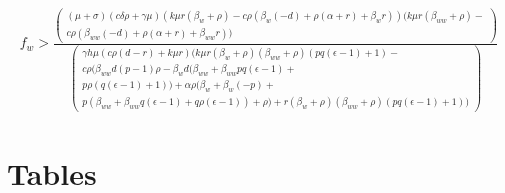 \documentclass[11pt]{article}
\begin{document}
\begin{align}
	f_w > \frac{\begin{pmatrix}
			(\mu +\sigma ) (c \delta  \rho +\gamma  \mu ) (k \mu  r (\beta_w+\rho )-c \rho  (\beta_w (-d)+\rho  (\alpha +r)+\beta_w r)) (k \mu  r (\beta_{ww}+\rho )- \\
			c \rho  (\beta_{ww} (-d)+\rho  (\alpha +r)+\beta_{ww} r))
		\end{pmatrix}}{\begin{pmatrix}
		\gamma  h \mu  (c \rho  (d-r)+k \mu  r) (k \mu  r (\beta_w+\rho ) (\beta_{ww}+\rho ) (p q (\epsilon -1)+1) - \\ 
		c \rho  (\beta_{ww} d (p-1) \rho -\beta_w d (\beta_{ww} + \beta_{ww} p q (\epsilon -1) + \\
		p \rho  (q (\epsilon -1)+1))+\alpha  \rho  (\beta_w+\beta_w (-p)+ \\ 
		p (\beta_{ww}+\beta_{ww} q (\epsilon -1)+q \rho  (\epsilon -1))+\rho )+r (\beta_w+\rho ) (\beta_{ww}+\rho ) (p q (\epsilon -1)+1))
	\end{pmatrix}}
\end{align}

\section*{Tables}
\end{document}
